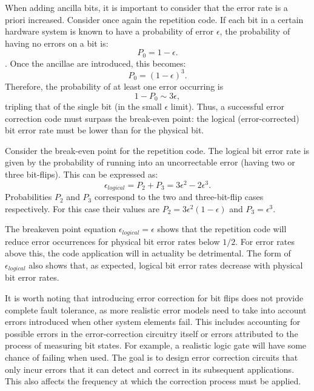When adding ancilla bits, it is important to consider that the error rate is a priori increased. Consider once again the repetition code. If each bit in a certain hardware system is known to have a probability of error $\epsilon$, the probability of having no errors on a bit is: \begin{equation}
    P_0=1-\epsilon.
\end{equation}.
Once the ancillae are introduced, this becomes:
\begin{equation}
    P_0=(1-\epsilon)^3.
\end{equation} 
Therefore, the probability of at least one error occurring is 
\begin{equation}
    1-P_0 \sim 3\epsilon,
\end{equation} 
tripling that of the single bit (in the small $\epsilon$ limit). Thus, a successful error correction code must surpass the break-even point: the logical (error-corrected) bit error rate must be lower than for the physical bit. 

Consider the break-even point for the repetition code. The logical bit error rate is given by the probability of running into an uncorrectable error (having two or three bit-flips). This can be expressed as:
\begin{equation}
    \epsilon_{logical} = P_2 + P_3 = 3\epsilon^2 - 2\epsilon^3.
\end{equation}
Probabilities $P_2$ and $P_3$ correspond to the two and three-bit-flip cases respectively. For this case their values are $P_2 = 3\epsilon^2(1-\epsilon)$ and $P_3 = \epsilon^3$.

The breakeven point equation $\epsilon_{logical}=\epsilon$ shows that the repetition code will reduce error occurrences for physical bit error rates below $1/2$. For error rates above this, the code application will in actuality be detrimental. The form of $\epsilon_{logical}$ also shows that, as expected, logical bit error rates decrease with physical bit error rates.

It is worth noting that introducing error correction for bit flips does not provide complete fault tolerance, as more realistic error models need to take into account errors introduced when other system elements fail. This includes accounting for possible errors in the error-correction circuitry itself or errors attributed to the process of measuring bit states. For example, a realistic logic gate will have some chance of failing when used. The goal is to design error correction circuits that only incur errors that it can detect and correct in its subsequent applications.
This also affects the frequency at which the correction process must be applied.

